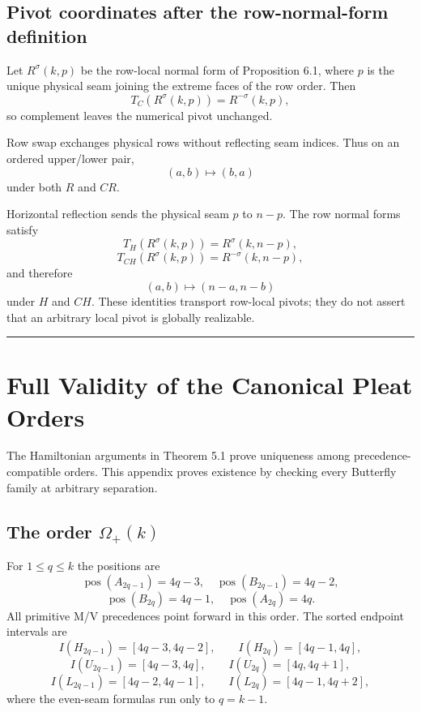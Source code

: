 \documentclass[11pt]{article}
\theoremstyle{definition}
\theoremstyle{remark}
\begin{document}
\subsection{Pivot coordinates after the row-normal-form
definition}\label{b.6.-pivot-coordinates-after-the-row-normal-form-definition}

Let \(R^\sigma(k,p)\) be the row-local normal form of Proposition 6.1,
where \(p\) is the unique physical seam joining the extreme faces of the
row order. Then \[
T_C(R^\sigma(k,p))=R^{-\sigma}(k,p),
\] so complement leaves the numerical pivot unchanged.

Row swap exchanges physical rows without reflecting seam indices. Thus
on an ordered upper/lower pair, \[
(a,b)\longmapsto(b,a)
\] under both \(R\) and \(CR\).

Horizontal reflection sends the physical seam \(p\) to \(n-p\). The row
normal forms satisfy \[
T_H(R^\sigma(k,p))=R^\sigma(k,n-p),
\] \[
T_{CH}(R^\sigma(k,p))=R^{-\sigma}(k,n-p),
\] and therefore \[
(a,b)\longmapsto(n-a,n-b)
\] under \(H\) and \(CH\). These identities transport row-local pivots;
they do not assert that an arbitrary local pivot is globally realizable.

\begin{center}\rule{0.5\linewidth}{0.5pt}\end{center}

\section{Full Validity of the Canonical Pleat Orders}\label{appendix-c.-full-validity-of-the-canonical-pleat-orders}

The Hamiltonian arguments in Theorem 5.1 prove uniqueness among
precedence-compatible orders. This appendix proves existence by checking
every Butterfly family at arbitrary separation.

\subsection{\texorpdfstring{The order
\(\Omega_+(k)\)}{The order \textbackslash Omega\_+(k)}}\label{c.1.-the-order-omega_k}

For \(1\le q\le k\) the positions are \[
\operatorname{pos}(A_{2q-1})=4q-3,\quad
\operatorname{pos}(B_{2q-1})=4q-2,
\] \[
\operatorname{pos}(B_{2q})=4q-1,\quad
\operatorname{pos}(A_{2q})=4q.
\] All primitive M/V precedences point forward in this order. The sorted
endpoint intervals are \[
I(H_{2q-1})=[4q-3,4q-2],\qquad I(H_{2q})=[4q-1,4q],
\] \[
I(U_{2q-1})=[4q-3,4q],\qquad I(U_{2q})=[4q,4q+1],
\] \[
I(L_{2q-1})=[4q-2,4q-1],\qquad I(L_{2q})=[4q-1,4q+2],
\] where the even-seam formulas run only to \(q=k-1\).
\end{document}
